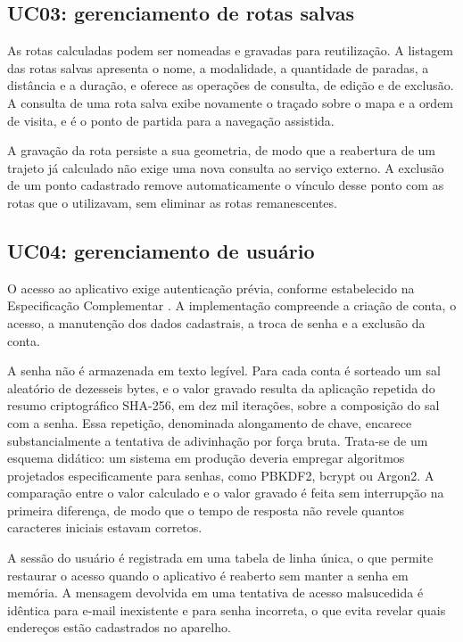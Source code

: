 \subsection{UC03: gerenciamento de rotas salvas}

As rotas calculadas podem ser nomeadas e gravadas para reutilização. A listagem das rotas salvas apresenta o nome, a modalidade, a quantidade de paradas, a distância e a duração, e oferece as operações de consulta, de edição e de exclusão. A consulta de uma rota salva exibe novamente o traçado sobre o mapa e a ordem de visita, e é o ponto de partida para a navegação assistida.

A gravação da rota persiste a sua geometria, de modo que a reabertura de um trajeto já calculado não exige uma nova consulta ao serviço externo. A exclusão de um ponto cadastrado remove automaticamente o vínculo desse ponto com as rotas que o utilizavam, sem eliminar as rotas remanescentes.

\subsection{UC04: gerenciamento de usuário}

O acesso ao aplicativo exige autenticação prévia, conforme estabelecido na Especificação Complementar \cite{sriEspecComp2025}. A implementação compreende a criação de conta, o acesso, a manutenção dos dados cadastrais, a troca de senha e a exclusão da conta.

A senha não é armazenada em texto legível. Para cada conta é sorteado um sal aleatório de dezesseis bytes, e o valor gravado resulta da aplicação repetida do resumo criptográfico SHA-256, em dez mil iterações, sobre a composição do sal com a senha. Essa repetição, denominada alongamento de chave, encarece substancialmente a tentativa de adivinhação por força bruta. Trata-se de um esquema didático: um sistema em produção deveria empregar algoritmos projetados especificamente para senhas, como PBKDF2, bcrypt ou Argon2. A comparação entre o valor calculado e o valor gravado é feita sem interrupção na primeira diferença, de modo que o tempo de resposta não revele quantos caracteres iniciais estavam corretos.

A sessão do usuário é registrada em uma tabela de linha única, o que permite restaurar o acesso quando o aplicativo é reaberto sem manter a senha em memória. A mensagem devolvida em uma tentativa de acesso malsucedida é idêntica para e-mail inexistente e para senha incorreta, o que evita revelar quais endereços estão cadastrados no aparelho.

